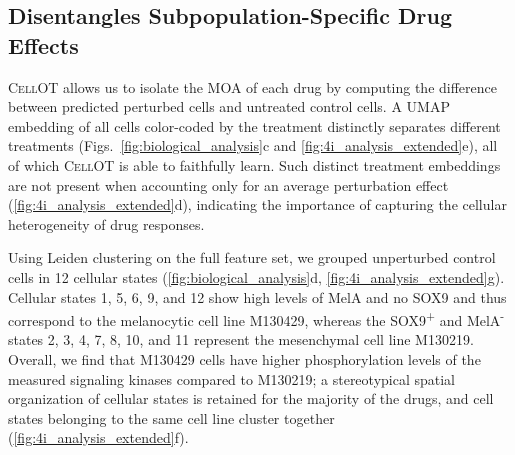 \subsection{Disentangles Subpopulation-Specific Drug Effects}
\textsc{CellOT} allows us to 
isolate the \acrlong{MOA} of each drug by computing the difference between predicted perturbed cells and untreated control cells. %
A \acrshort{UMAP} embedding of all cells color-coded by the treatment distinctly separates different treatments (Figs.~\ref{fig:biological_analysis}c and \ref{fig:4i_analysis_extended}e), all of which \textsc{CellOT} is able to faithfully learn.
Such distinct treatment embeddings are not present when accounting only for an average perturbation effect (\cref{fig:4i_analysis_extended}d), indicating the importance of capturing the cellular heterogeneity of drug responses.

 Using Leiden clustering on the full feature set, we grouped unperturbed control cells in 12 cellular states (\cref{fig:biological_analysis}d, \cref{fig:4i_analysis_extended}g). Cellular states 1, 5, 6, 9, and 12 show high levels of MelA and no SOX9 and thus correspond to the melanocytic cell line M130429, whereas the SOX9\textsuperscript{+} and MelA\textsuperscript{-} states 2, 3, 4, 7, 8, 10, and 11 represent the mesenchymal cell line M130219. Overall, we find that M130429 cells have higher phosphorylation levels of the measured signaling kinases compared to M130219;
a stereotypical spatial organization of cellular states is retained for the majority of the drugs,  and cell states belonging to the same cell line cluster together (\cref{fig:4i_analysis_extended}f). 

